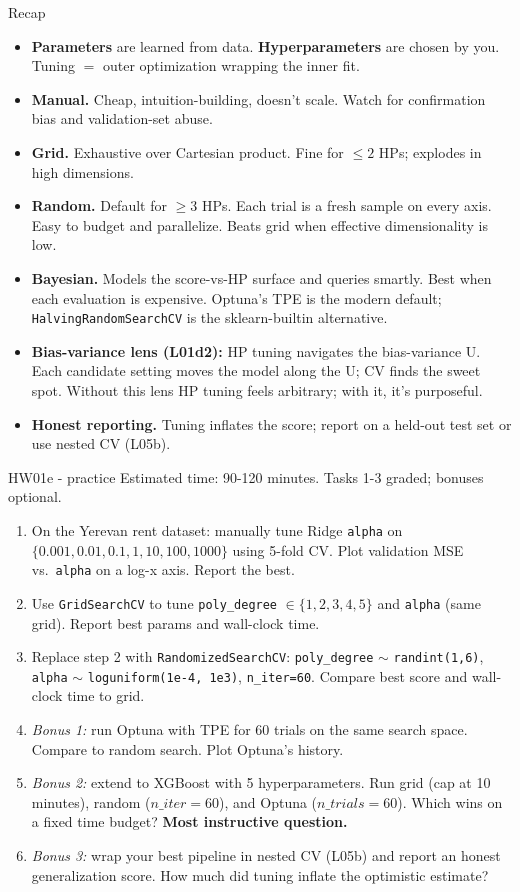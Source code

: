 \documentclass[aspectratio=169]{beamer}
\begin{document}
\begin{frame}{Recap}
  \begin{itemize}\small
    \item \textbf{Parameters} are learned from data. \textbf{Hyperparameters} are chosen by you. Tuning $=$ outer optimization wrapping the inner fit.
    \item \textbf{Manual.} Cheap, intuition-building, doesn't scale. Watch for confirmation bias and validation-set abuse.
    \item \textbf{Grid.} Exhaustive over Cartesian product. Fine for $\leq 2$ HPs; explodes in high dimensions.
    \item \textbf{Random.} Default for $\geq 3$ HPs. Each trial is a fresh sample on every axis. Easy to budget and parallelize. Beats grid when effective dimensionality is low.
    \item \textbf{Bayesian.} Models the score-vs-HP surface and queries smartly. Best when each evaluation is expensive. Optuna's TPE is the modern default; \texttt{HalvingRandomSearchCV} is the sklearn-builtin alternative.
    \item \textbf{Bias-variance lens (L01d2):} HP tuning navigates the bias-variance U. Each candidate setting moves the model along the U; CV finds the sweet spot. Without this lens HP tuning feels arbitrary; with it, it's purposeful.
    \item \textbf{Honest reporting.} Tuning inflates the score; report on a held-out test set or use nested CV (L05b).
  \end{itemize}
\end{frame}

\begin{frame}{HW01e - practice}
  \footnotesize Estimated time: 90-120 minutes. Tasks 1-3 graded; bonuses optional.
  \begin{enumerate}\small
    \item On the Yerevan rent dataset: manually tune Ridge \texttt{alpha} on $\{0.001, 0.01, 0.1, 1, 10, 100, 1000\}$ using 5-fold CV. Plot validation MSE vs.\ \texttt{alpha} on a log-x axis. Report the best.
    \item Use \texttt{GridSearchCV} to tune \texttt{poly\_degree} $\in \{1,2,3,4,5\}$ and \texttt{alpha} (same grid). Report best params and wall-clock time.
    \item Replace step 2 with \texttt{RandomizedSearchCV}: \texttt{poly\_degree} $\sim$ \texttt{randint(1,6)}, \texttt{alpha} $\sim$ \texttt{loguniform(1e-4, 1e3)}, \texttt{n\_iter=60}. Compare best score and wall-clock time to grid.
    \item \emph{Bonus 1:} run Optuna with TPE for 60 trials on the same search space. Compare to random search. Plot Optuna's history.
    \item \emph{Bonus 2:} extend to XGBoost with 5 hyperparameters. Run grid (cap at 10 minutes), random ($n\_iter=60$), and Optuna ($n\_trials=60$). Which wins on a fixed time budget? \textbf{Most instructive question.}
    \item \emph{Bonus 3:} wrap your best pipeline in nested CV (L05b) and report an honest generalization score. How much did tuning inflate the optimistic estimate?
  \end{enumerate}
\end{frame}
\end{document}
